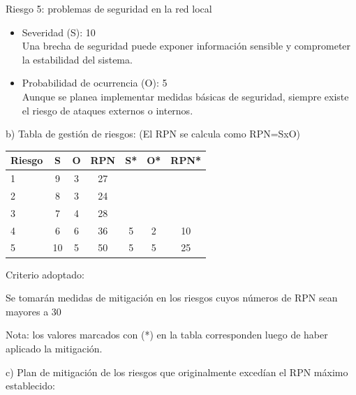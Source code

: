 \documentclass[
11pt, %
]{charter}
\begin{document}
Riesgo 5: problemas de seguridad en la red local
\begin{itemize}
	\item Severidad (S): 10 \\ 
	Una brecha de seguridad puede exponer información sensible y comprometer la estabilidad del sistema.
	\item Probabilidad de ocurrencia (O): 5 \\
	Aunque se planea implementar medidas básicas de seguridad, siempre existe el riesgo de ataques externos o internos.
\end{itemize}   



b) Tabla de gestión de riesgos: (El RPN se calcula como RPN=SxO)

\begin{table}[htpb]
\centering
\begin{tabularx}{\linewidth}{@{}|X|c|c|c|c|c|c|@{}}
\hline
\rowcolor[HTML]{C0C0C0} 
Riesgo & S & O & RPN & S* & O* & RPN* \\ \hline
     1 & 9 & 3 &  27 &    &    &      \\ \hline
     2 & 8 & 3 &  24 &    &    &      \\ \hline
     3 & 7 & 4 &  28 &    &    &      \\ \hline
     4 & 6 & 6 &  36 & 5  & 2  & 10   \\ \hline
     5 & 10 & 5 & 50 & 5  & 5  & 25   \\ \hline
\end{tabularx}%
\end{table}

Criterio adoptado: 

Se tomarán medidas de mitigación en los riesgos cuyos números de RPN sean mayores a 30

Nota: los valores marcados con (*) en la tabla corresponden luego de haber aplicado la mitigación.

c) Plan de mitigación de los riesgos que originalmente excedían el RPN máximo establecido:
 
\end{document}
